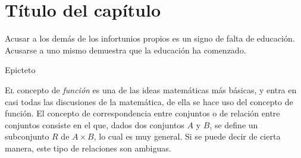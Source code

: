 \chapter{Título del capítulo}\label{cap:06}
\pagecolor{white}
\BgThispage
\thispagestyle{empty}
\pagestyle{isfodosuCD}
\epigraph{Acusar a los demás de los infortunios propios es un signo de falta de educación. Acusarse a uno mismo 
demuestra que la educación ha comenzado.}{Epicteto}


\lettrine[lraise=0, lines=4, loversize=0]{\textcolor{azulF}{E}}{l} concepto de \textit{función} es una de las ideas 
matemáticas más básicas, y entra en casi todas las discusiones de la matemática, de ella se hace uso del concepto de 
función. El concepto de correspondencia entre conjuntos o de relación entre conjuntos consiste en el que, dados dos 
conjuntos $A$ y $B$, se define un subconjunto $R$ de $A\times B$, lo cual es muy general. Si se puede decir de cierta 
manera, este tipo de relaciones son ambiguas.


\pagestyle{probprop}
\pagecolor{paginaprob}


